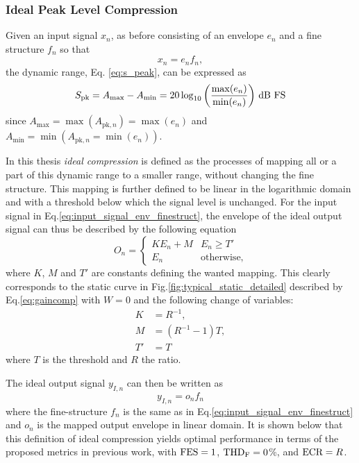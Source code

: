 \documentclass[../main2.tex]{subfiles}
\begin{document}
\FloatBarrier
\subsubsection{Ideal Peak Level Compression}
\label{method_ideal_peak_compression}
Given an input signal $x_n$, as before consisting of an envelope $e_n$ and a fine structure $f_n$ so that
\begin{equation}\label{eq:input_signal_env_finestruct}
x_n = e_n f_n,
\end{equation}
the dynamic range, Eq. \eqref{eq:s_peak}, can be expressed as
\begin{equation}
S_\text{pk} =A_\text{max} - A_\text{min} = 20 \log_{10} \left(\frac{\max(e_n)}{\min(e_n)}\right) \mskip3mu\text{dB FS}
\end{equation}
since $A_\text{max} = \max(A_{\text{pk},n}) = \max(e_n)$ and $A_\text{min} =  \min(A_{\text{pk},n}=\min(e_n))$.
 
In this thesis \emph{ideal compression} is defined as the processes of mapping all or a part of this dynamic range to a smaller range, without changing the fine structure. This mapping is further defined to be linear in the logarithmic domain and with a threshold below which the signal level is unchanged. For the input signal in Eq.\eqref{eq:input_signal_env_finestruct}, the envelope of the ideal output signal can thus be described by the following equation
\begin{equation}\label{eq:dynamic_range_mapping}
O_n =
\begin{cases}
	K E_n + M 					& E_n \geq T'  \\
	E_n							& \text{otherwise},
\end{cases} 
\end{equation}\label{eq:ideal_output_envelope}
where $K$, $M$ and $T'$ are constants defining the wanted mapping. This clearly corresponds to the static curve in Fig.\ref{fig:typical_static_detailed} described by Eq.\eqref{eq:gaincomp} with $W=0$ and the following change of variables:
\begin{equation}
\begin{split}
K &= R^{-1}, \\
M &= (R^{-1}-1)T,\\
T' &= T
\end{split}
\end{equation}
where $T$ is the threshold and $R$ the ratio.

The ideal output signal $y_{I,n}$ can then be written as
\begin{equation}\label{eq:ideal_output}
y_{I,n} = o_n f_n
\end{equation}
where the fine-structure $f_n$ is the same as in Eq.\eqref{eq:input_signal_env_finestruct} and $o_n$ is the mapped output envelope in linear domain. It is shown below that this definition of ideal compression yields optimal performance in terms of the proposed metrics in previous work, with $\text{FES} = 1$, $\text{THD}_\text{F}=0$\%, and $\text{ECR}=R$.
\end{document}
